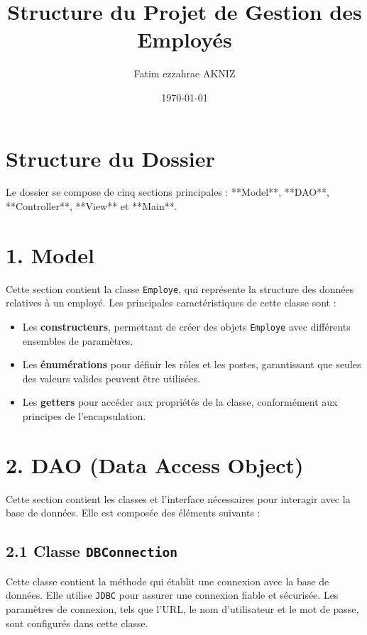\documentclass[a4paper,12pt]{report}
\title{\textbf{Structure du Projet de Gestion des Employés}}
\author{Fatim ezzahrae AKNIZ}
\date{\today}
\begin{document}
\maketitle

\section*{\textcolor{myblue}{Structure du Dossier}}

Le dossier se compose de cinq sections principales : **Model**, **DAO**, **Controller**, **View** et **Main**.

\section*{\textcolor{myblue}{1. Model}}

Cette section contient la classe \texttt{Employe}, qui représente la structure des données relatives à un employé. Les principales caractéristiques de cette classe sont :

\begin{itemize}
    \item Les \textbf{constructeurs}, permettant de créer des objets \texttt{Employe} avec différents ensembles de paramètres.
    \item Les \textbf{énumérations} pour définir les rôles et les postes, garantissant que seules des valeurs valides peuvent être utilisées.
    \item Les \textbf{getters} pour accéder aux propriétés de la classe, conformément aux principes de l'encapsulation.
\end{itemize}

\section*{\textcolor{myblue}{2. DAO (Data Access Object)}}

Cette section contient les classes et l'interface nécessaires pour interagir avec la base de données. Elle est composée des éléments suivants :

\subsection*{\textcolor{mygreen}{2.1 Classe \texttt{DBConnection}}}
Cette classe contient la méthode qui établit une connexion avec la base de données. Elle utilise \texttt{JDBC} pour assurer une connexion fiable et sécurisée. Les paramètres de connexion, tels que l'URL, le nom d'utilisateur et le mot de passe, sont configurés dans cette classe.
\end{document}
